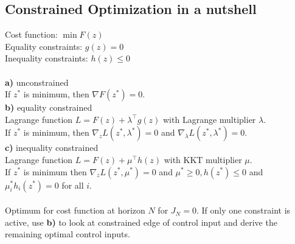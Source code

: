 \documentclass[english]{latex4ei/latex4ei_sheet}
\begin{document}
\begin{sectionbox}
\subsection{Constrained Optimization in a nutshell}
Cost function: $\min F(z)$\\
Equality constraints: $g(z)=0$\\
Inequality constraints: $h(z)\leq 0$\\
\\
\textbf{a)} unconstrained\\
If $z^*$ is minimum, then $\nabla F(z^*)=0$.\\
\textbf{b)} equality constrained\\
Lagrange function $L=F(z)+\lambda^{\top} g(z)$ with Lagrange multiplier $\lambda$. \\ 
If $z^{*}$ is minimum, then $\nabla_{z} L\left(z^{*}, \lambda^{*}\right)=0$ and $\nabla_{\lambda} L\left(z^{*}, \lambda^{*}\right)=0$. \\
\textbf{c)} inequality constrained\\
Lagrange function $L=F(z)+\mu^{\top} h(z)$ with KKT multiplier $\mu$. \\
If $z^{*}$ is minimum then $\nabla_{z} L\left(z^{*}, \mu^{*}\right)=0$ and $\mu^{*} \geq 0, h\left(z^{*}\right) \leq 0$ and $\mu_{i}^{*} h_{i}\left(z^{*}\right)=0$ for all $i$.\\
\\
Optimum for cost function at horizon $N$ for $J_N=0$. If only one constraint is active, use \textbf{b)} to look at constrained edge of control input and derive the remaining optimal control inputs.

\end{sectionbox}
\vspace{5cm}
\end{document}
